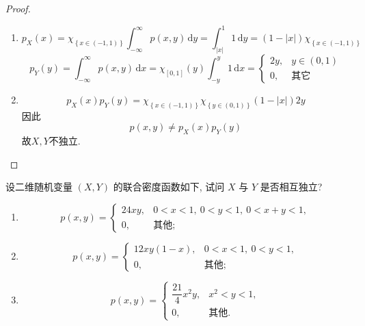 \documentclass[../main.tex]{subfiles}
\begin{document}
\begin{proof}
    \begin{enumerate}
    \item  \[
    p_{X}\left( x \right)=\chi _{\left\{ x\in \left( -1,1 \right)  \right\}} \int_{-\infty}^{\infty}p\left( x,y \right)\,\mathrm{d} y=  \int_{\left| x \right| }^{1}1\,\mathrm{d} y= \left( 1-\left| x \right|   \right)\chi _{\left\{ x\in \left( -1,1 \right)  \right\}}  
    \]\[
    p_{Y}\left( y \right)=  \int_{-\infty}^{\infty}p\left( x,y \right)\,\mathrm{d} x= \chi _{\left[ 0,1 \right] }\left( y \right)  \int_{-y}^{y}  1\,\mathrm{d} x= \begin{cases} 2y,& y\in \left( 0,1 \right)\\ 
     0,&  \text{其它} \end{cases} 
    \]
    \item  \[
    p_{X}\left( x \right)p_{Y}\left( y \right)= \chi _{\left\{ x\in \left( -1,1 \right)  \right\}}\chi _{\left\{ y\in \left( 0,1 \right)  \right\}} \left( 1-\left| x \right|  \right)2y  
    \] 因此 \[
    p\left( x,y \right)\neq p_{X}\left( x \right)p_{Y}\left( y \right)   
    \]故\(  X,Y  \)不独立. 
   \end{enumerate}
   
\end{proof}
\begin{exercise}{}{}
设二维随机变量 $(X,Y)$ 的联合密度函数如下, 试问 $X$ 与 $Y$ 是否相互独立?
\begin{enumerate}
  \item 
  \[
  p(x,y) = 
  \begin{cases}
    24xy, & 0<x<1,\ 0<y<1,\ 0<x+y<1,\\
    0, & \text{其他};
  \end{cases}
  \]
  \item 
  \[
  p(x,y) = 
  \begin{cases}
    12xy(1-x), & 0<x<1,\ 0<y<1,\\
    0, & \text{其他};
  \end{cases}
  \]
  \item 
  \[
  p(x,y) = 
  \begin{cases}
    \dfrac{21}{4}x^{2}y, & x^{2}<y<1,\\
    0, & \text{其他}.
  \end{cases}
  \]
\end{enumerate}
\end{exercise}
\end{document}
